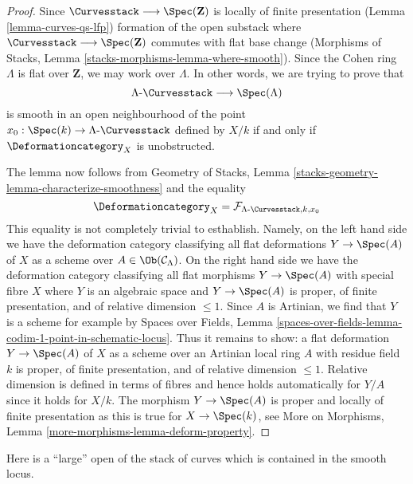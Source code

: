 \begin{proof}
Since $\Curvesstack \longrightarrow \Spec(\mathbf{Z})$ is locally
of finite presentation (Lemma \ref{lemma-curves-qs-lfp})
formation of the open substack where
$\Curvesstack \longrightarrow \Spec(\mathbf{Z})$ commutes with
flat base change
(Morphisms of Stacks, Lemma \ref{stacks-morphisms-lemma-where-smooth}).
Since the Cohen ring $\Lambda$ is flat over $\mathbf{Z}$,
we may work over $\Lambda$. In other words, we are trying to prove that
$$
\Lambda\text{-}\Curvesstack \longrightarrow \Spec(\Lambda)
$$
is smooth in an open neighbourhood of the point
$x_0 : \Spec(k) \to \Lambda\text{-}\Curvesstack$
defined by $X/k$ if and only if $\Deformationcategory_X$ is unobstructed.

\medskip\noindent
The lemma now follows from
Geometry of Stacks, Lemma \ref{stacks-geometry-lemma-characterize-smoothness}
and the equality
$$
\Deformationcategory_X =
\mathcal{F}_{\Lambda\text{-}\Curvesstack, k, x_0}
$$
This equality is not completely trivial to esthablish. Namely, on the left
hand side we have the deformation category classifying all flat deformations
$Y \to \Spec(A)$ of $X$ as a scheme over $A \in \Ob(\mathcal{C}_\Lambda)$.
On the right hand side we have the deformation category classifying all
flat morphisms $Y \to \Spec(A)$ with special fibre $X$
where $Y$ is an algebraic space and
$Y \to \Spec(A)$ is proper, of finite presentation, and of
relative dimension $\leq 1$. Since $A$ is Artinian, we find
that $Y$ is a scheme for example by Spaces over Fields, Lemma
\ref{spaces-over-fields-lemma-codim-1-point-in-schematic-locus}.
Thus it remains to show: a flat deformation $Y \to \Spec(A)$ of
$X$ as a scheme over an Artinian local ring $A$ with residue field $k$
is proper, of finite presentation, and of relative dimension $\leq 1$.
Relative dimension is defined in terms of fibres and hence holds
automatically for $Y/A$ since it holds for $X/k$.
The morphism $Y \to \Spec(A)$ is proper and locally of finite presentation
as this is true for $X \to \Spec(k)$, see
More on Morphisms, Lemma \ref{more-morphisms-lemma-deform-property}.
\end{proof}

\noindent
Here is a ``large'' open of the stack of curves which is contained
in the smooth locus.

